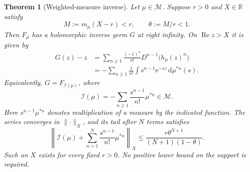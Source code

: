 \documentclass[11pt,a4paper]{article}
\newtheorem{theorem}{Theorem}[section]
\theoremstyle{definition}
\theoremstyle{remark}
\newcommand{\R}{\mathbb R}
\newcommand{\Inv}{\mathcal I}
\newcommand{\dd}{\,\mathrm d}
\newcommand{\e}{\mathrm e}
\newcommand{\Rea}{\operatorname{Re}}
\newcommand{\normx}[2]{\lVert #1\rVert_{#2}}
\numberwithin{equation}{section}
\begin{document}
\begin{theorem}[Weighted-measure inverse]\label{thm:inverse}
Let $\mu\in\mathcal M$. Suppose $r>0$ and $X\in\R$ satisfy
\begin{equation}\label{eq:theta}
 M:=m_\mu(X-r)<r,\qquad \theta:=M/r<1.
\end{equation}
Then $F_\mu$ has a holomorphic inverse germ $G$ at right infinity. On $\Rea z>X$ it is given by
\begin{align}
 G(z)-z
 &=\sum_{n\ge1}\frac{(-1)^n}{n!}
       D^{n-1}\bigl(h_\mu(z)^n\bigr)\label{eq:lagrange}\\
 &=-\sum_{n\ge1}\frac1{n!}
       \int s^{n-1}\e^{-sz}\dd\mu^{*n}(s).\label{eq:inverseintegral}
\end{align}
Equivalently, $G=F_{\Inv(\mu)}$, where
\begin{equation}\label{eq:inversemeasure}
 \Inv(\mu)=-\sum_{n\ge1}\frac{s^{n-1}}{n!}\mu^{*n}\in\mathcal M.
\end{equation}
Here $s^{n-1}\mu^{*n}$ denotes multiplication of a measure by the indicated function. The series converges in $\normx{\cdot}{X}$, and its tail after $N$ terms satisfies
\begin{equation}\label{eq:geometricbound}
 \left\|\Inv(\mu)+\sum_{n=1}^{N}\frac{s^{n-1}}{n!}\mu^{*n}\right\|_X
 \le \frac{r\theta^{N+1}}{(N+1)(1-\theta)}.
\end{equation}
Such an $X$ exists for every fixed $r>0$. No positive lower bound on the support is required.
\end{theorem}
\end{document}
